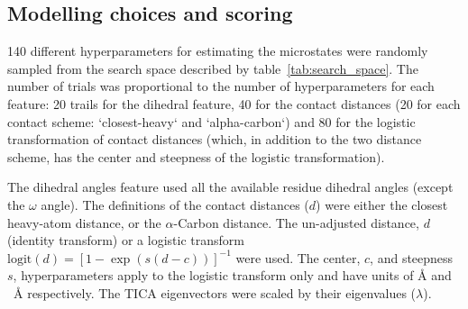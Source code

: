 \documentclass[journal=jacsat,manuscript=article]{achemso}
\begin{document}
\subsection{Modelling choices and scoring}
\num{140} different hyperparameters for estimating the microstates were randomly sampled from the search space described by table~\ref{tab:search_space}. The number of trials was proportional to the number of hyperparameters for each feature: 20 trails for the dihedral feature, 40 for the contact distances (20 for each contact scheme: `closest-heavy` and `alpha-carbon`) and 80 for the logistic transformation of contact distances (which, in addition to the two distance scheme, has the center and steepness of the logistic transformation).  

The dihedral angles feature used all the available residue dihedral angles (except the $\omega$ angle). The definitions of the contact distances ($d$) were either the closest heavy-atom distance, or the $\alpha$-Carbon distance. The un-adjusted distance, $d$ (identity transform) or a  logistic transform $\mathrm{logit}(d) = [1-\exp{(s(d-c))}]^{-1}$ were used. The center, $c$, and steepness $s$, hyperparameters apply to the logistic transform only and have units of \si{\angstrom} and \si{\per\angstrom} respectively. The TICA eigenvectors were scaled by their eigenvalues ($\lambda$).
\end{document}
